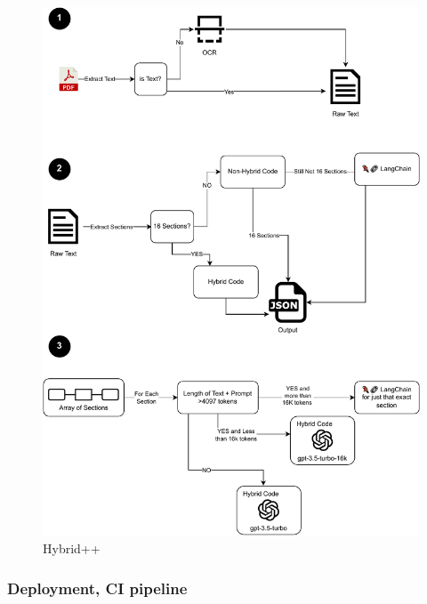 \documentclass[a4paper,12pt,twoside]{report}
\begin{document}
\begin{figure}[H]
		\includegraphics[width=\textwidth, keepaspectratio ]{images/bigCode}
	\caption[Improvements on Hybrid code]{Hybrid++}
\label{Hybrid++}
\end{figure}
\subsubsection{Deployment, CI pipeline}
\end{document}
